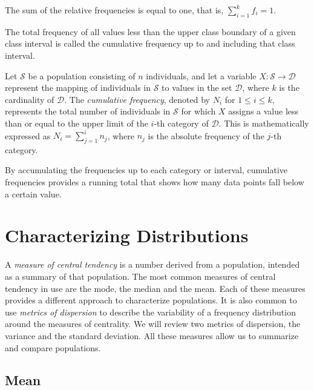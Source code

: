 The sum of the relative frequencies is equal to one, that is, $\sum_{i=1}^k f_i = 1$.

The total frequency of all values less than the upper class boundary of a given class interval is called the cumulative frequency up to and including that class interval.

\begin{definition}
Let $\mathcal{S}$ be a population consisting of $n$ individuals, and let a variable $X: \mathcal{S} \rightarrow \mathcal{D}$ represent the mapping of individuals in $\mathcal{S}$ to values in the set $\mathcal{D}$, where $k$ is the cardinality of $\mathcal{D}$. The \emph{cumulative frequency}, denoted by $N_i$ for $1 \leq i \leq k$, represents the total number of individuals in $\mathcal{S}$ for which $X$ assigns a value less than or equal to the upper limit of the $i$-th category of $\mathcal{D}$. This is mathematically expressed as $N_i = \sum_{j=1}^i n_j$, where $n_j$ is the absolute frequency of the $j$-th category.
\end{definition}

By accumulating the frequencies up to each category or interval, cumulative frequencies provides a running total that shows how many data points fall below a certain value.

%
%

\section{Characterizing Distributions}
\label{sec:measures_central_tendency}

A \emph{measure of central tendency} is a number derived from a population, intended as a summary of that population. The most common measures of central tendency in use are the mode, the median and the mean. Each of these measures provides a different approach to characterize populations. It is also common to use \emph{metrics of dispersion} to describe the variability of a frequency distribution around the measures of centrality. We will review two metrics of dispersion, the variance and the standard deviation. All these measures allow us to summarize and compare populations.


\subsection*{Mean}
\label{sec:mean}

